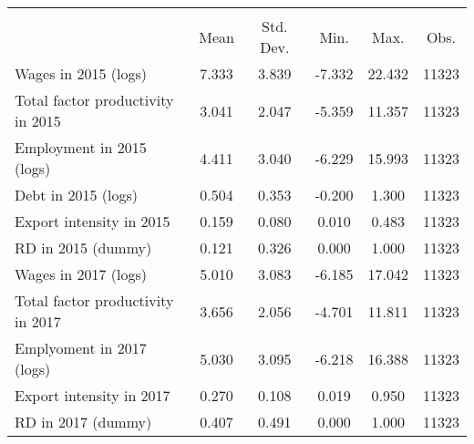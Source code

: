{
\def\sym#1{\ifmmode^{#1}\else\(^{#1}\)\fi}
\begin{tabular}{l*{1}{ccccc}}
\hline\hline
                    &\multicolumn{5}{c}{}                                            \\
                    &        Mean&   Std. Dev.&        Min.&        Max.&        Obs.\\
\hline
Wages in 2015 (logs)&       7.333&       3.839&      -7.332&      22.432&       11323\\
Total factor productivity in 2015&       3.041&       2.047&      -5.359&      11.357&       11323\\
Employment in 2015 (logs)&       4.411&       3.040&      -6.229&      15.993&       11323\\
Debt in 2015 (logs) &       0.504&       0.353&      -0.200&       1.300&       11323\\
Export intensity in 2015&       0.159&       0.080&       0.010&       0.483&       11323\\
RD in 2015 (dummy)  &       0.121&       0.326&       0.000&       1.000&       11323\\
Wages in 2017 (logs)&       5.010&       3.083&      -6.185&      17.042&       11323\\
Total factor productivity in 2017&       3.656&       2.056&      -4.701&      11.811&       11323\\
Emplyoment in 2017 (logs)&       5.030&       3.095&      -6.218&      16.388&       11323\\
Export intensity in 2017&       0.270&       0.108&       0.019&       0.950&       11323\\
RD in 2017 (dummy)  &       0.407&       0.491&       0.000&       1.000&       11323\\
\hline\hline
\end{tabular}
}

